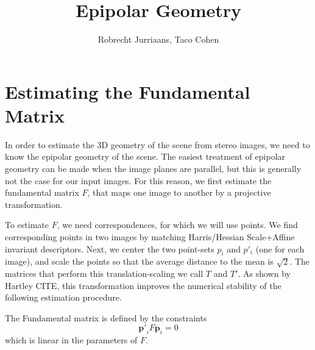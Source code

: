\documentclass[a4paper,10pt]{article}
\title{Epipolar Geometry}
\author{Robrecht Jurriaans, Taco Cohen}
\begin{document}
\maketitle

\section{Estimating the Fundamental Matrix}

In order to estimate the 3D geometry of the scene from stereo images, we need to know the epipolar geometry of the scene.
The easiest treatment of epipolar geometry can be made when the image planes are parallel, but this is generally not the case for our input images.
For this reason, we first estimate the fundamental matrix $F$, that maps one image to another by a projective transformation.

To estimate $F$, we need correspondences, for which we will use points.
We find corresponding points in two images by matching Harris/Hessian Scale+Affine invariant descriptors.
Next, we center the two point-sets ${p_i}$ and ${p'_i}$ (one for each image), and scale the points so that the average distance to the mean is $\sqrt{2}$.
The matrices that perform this translation-scaling we call $T$ and $T'$.
As shown by Hartley CITE, this transformation improves the numerical stability of the following estimation procedure.

The Fundamental matrix is defined by the constraints
\begin{equation}
\mathbf{p'}_i F \mathbf{p}_i = 0
\end{equation}
which is linear in the parameters of $F$.
\end{document}
